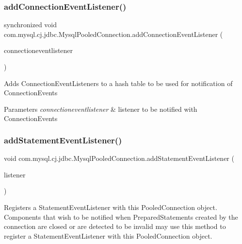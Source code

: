 \subsubsection{\texorpdfstring{add\+Connection\+Event\+Listener()}{addConnectionEventListener()}}
{\footnotesize\ttfamily synchronized void com.\+mysql.\+cj.\+jdbc.\+Mysql\+Pooled\+Connection.\+add\+Connection\+Event\+Listener (\begin{DoxyParamCaption}\item[{Connection\+Event\+Listener}]{connectioneventlistener }\end{DoxyParamCaption})}

Adds Connection\+Event\+Listeners to a hash table to be used for notification of Connection\+Events


\begin{DoxyParams}{Parameters}
{\em connectioneventlistener} & listener to be notified with Connection\+Events \\
\hline
\end{DoxyParams}
\mbox{\label{classcom_1_1mysql_1_1cj_1_1jdbc_1_1_mysql_pooled_connection_aa2d07be72ad7852dec58ce9c5e32f7da}} 
\subsubsection{\texorpdfstring{add\+Statement\+Event\+Listener()}{addStatementEventListener()}}
{\footnotesize\ttfamily void com.\+mysql.\+cj.\+jdbc.\+Mysql\+Pooled\+Connection.\+add\+Statement\+Event\+Listener (\begin{DoxyParamCaption}\item[{Statement\+Event\+Listener}]{listener }\end{DoxyParamCaption})}

Registers a {\ttfamily Statement\+Event\+Listener} with this {\ttfamily Pooled\+Connection} object. Components that wish to be notified when {\ttfamily Prepared\+Statement}s created by the connection are closed or are detected to be invalid may use this method to register a {\ttfamily Statement\+Event\+Listener} with this {\ttfamily Pooled\+Connection} object.


